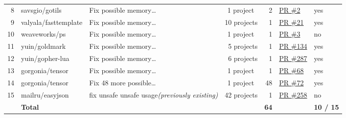 \begin{table}[htp!]
{\begin{tabularx}{\textwidth}{rlXrrll}
        \rowcolor{verylightgray}
        8  & savsgio/gotils               & Fix possible memory\ldots                                       &  1 project~         &  2            & \href{https://github.com/savsgio/gotils/pull/2}{PR \#2}                & yes              \\
        9  & valyala/fasttemplate         & Fix possible memory\ldots                                       & 10 projects         &  1            & \href{https://github.com/valyala/fasttemplate/pull/21}{PR \#21}        & yes              \\
        \rowcolor{verylightgray}
        10 & weaveworks/ps                & Fix possible memory\ldots                                       &  1 project~         &  1            & \href{https://github.com/weaveworks/ps/pull/3}{PR \#3}                 & no               \\
        11 & yuin/goldmark                & Fix possible memory\ldots                                       &  5 projects         &  1            & \href{https://github.com/yuin/goldmark/pull/134}{PR \#134}             & yes              \\
        \rowcolor{verylightgray}
        12 & yuin/gopher-lua              & Fix possible memory\ldots                                       &  6 projects         &  1            & \href{https://github.com/yuin/gopher-lua/pull/287}{PR \#287}           & yes              \\
        13 & gorgonia/tensor              & Fix possible memory\ldots                                       &  1 project~         &  1            & \href{https://github.com/gorgonia/tensor/pull/68}{PR \#68}             & yes              \\
        \rowcolor{verylightgray}
        14 & gorgonia/tensor              & Fix 48 more possible\ldots                                      &  1 project~         & 48            & \href{https://github.com/gorgonia/tensor/pull/72}{PR \#72}             & yes              \\
        15 & mailru/easyjson              & fix unsafe unsafe usage\newline \textit{(previously existing)}  & 42 projects         &  1            & \href{https://github.com/mailru/easyjson/pull/258}{PR \#258}           & no               \\
        \hline
        {} & \multicolumn{3}{l}{\textbf{Total}}                                                                                   & \textbf{64}   & {}                                                                     & \textbf{10 / 15} \\
        \end{tabularx}
    }
\end{table}